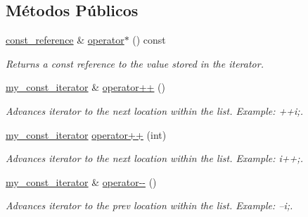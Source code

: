 \subsection*{Métodos Públicos}
\begin{DoxyCompactItemize}
\item 
\mbox{\label{classls_1_1my__const__iterator_a2465f5fcba843f6f65729e3d181b04f8}} 
\hyperlink{classls_1_1my__const__iterator_a47552bc9ef18669651047b1741c7ed42}{const\+\_\+reference} \& \hyperlink{classls_1_1my__const__iterator_a2465f5fcba843f6f65729e3d181b04f8}{operator$\ast$} () const
\begin{DoxyCompactList}\small\item\em Returns a const reference to the value stored in the iterator. \end{DoxyCompactList}\item 
\mbox{\label{classls_1_1my__const__iterator_af058227856ecbcad2fe686a552ff2aec}} 
\hyperlink{classls_1_1my__const__iterator}{my\+\_\+const\+\_\+iterator} \& \hyperlink{classls_1_1my__const__iterator_af058227856ecbcad2fe686a552ff2aec}{operator++} ()
\begin{DoxyCompactList}\small\item\em Advances iterator to the next location within the list. Example\+: ++i;. \end{DoxyCompactList}\item 
\mbox{\label{classls_1_1my__const__iterator_a13a2d927db55c7571ee2a6c835dc208b}} 
\hyperlink{classls_1_1my__const__iterator}{my\+\_\+const\+\_\+iterator} \hyperlink{classls_1_1my__const__iterator_a13a2d927db55c7571ee2a6c835dc208b}{operator++} (int)
\begin{DoxyCompactList}\small\item\em Advances iterator to the next location within the list. Example\+: i++;. \end{DoxyCompactList}\item 
\mbox{\label{classls_1_1my__const__iterator_a44b566c18e94090b66101f604c17878e}} 
\hyperlink{classls_1_1my__const__iterator}{my\+\_\+const\+\_\+iterator} \& \hyperlink{classls_1_1my__const__iterator_a44b566c18e94090b66101f604c17878e}{operator-\/-\/} ()
\begin{DoxyCompactList}\small\item\em Advances iterator to the prev location within the list. Example\+: --i;. \end{DoxyCompactList}\item 

\end{DoxyCompactItemize}
